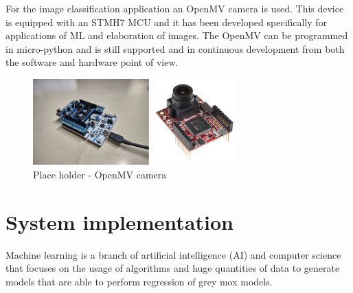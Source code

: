 \documentclass[12pt]{report}
\begin{document}
For the image classification application an OpenMV camera is used. This device is equipped with an STMH7 MCU and it has been developed specifically for applications of ML and elaboration of images. The OpenMV \autocite{openmv_web_page} can be programmed in micro-python and is still supported and in continuous development from both the software and hardware point of view. 
%
\begin{figure}[h!]
    \centering
    \includegraphics[width=0.7\textwidth]{Figures/Chapter2/hardware.jpg} 
    \caption{Place holder - OpenMV camera}
    \label{fig:hardware_openmv}    
\end{figure}
%




\chapter{System implementation}

Machine learning is a branch of artificial intelligence (AI) and computer science that focuses on the usage of algorithms and huge quantities of data to generate models that are able to perform regression of grey mox models. 
\end{document}
